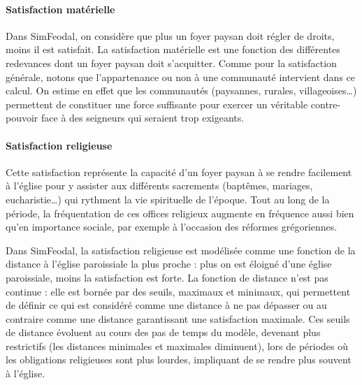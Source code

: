 \paragraph{Satisfaction matérielle}

\begin{tcolorbox}[breakable,left=0pt,right=0pt,top=0pt,bottom=0pt,
	colback=gray!15,colframe=gray!15,width=\dimexpr\textwidth\relax, 
	enlarge left by=0mm, boxsep=5pt,arc=0pt,outer arc=0pt]
Dans SimFeodal, on considère que plus un foyer paysan doit régler de droits, moins il est satisfait.
La satisfaction matérielle est une fonction des différentes redevances dont un foyer paysan doit s'acquitter.
Comme pour la satisfaction générale, notons que l'appartenance ou non à une communauté intervient dans ce calcul.
On estime en effet que les communautés (paysannes, rurales, villageoises\ldots) permettent de constituer une force suffisante pour exercer un véritable contre-pouvoir face à des seigneurs qui seraient trop exigeants.
\end{tcolorbox}

\paragraph{Satisfaction religieuse}

Cette satisfaction représente la capacité d'un foyer paysan à se rendre facilement à l'église pour y assister aux différents sacrements (baptêmes, mariages, eucharistie\ldots) qui rythment la vie spirituelle de l'époque.
Tout au long de la période, la fréquentation de ces offices religieux augmente en fréquence aussi bien qu'en importance sociale, par exemple à l'occasion des réformes grégoriennes.

\begin{tcolorbox}[breakable,left=0pt,right=0pt,top=0pt,bottom=0pt,
	colback=gray!15,colframe=gray!15,width=\dimexpr\textwidth\relax, 
	enlarge left by=0mm, boxsep=5pt,arc=0pt,outer arc=0pt]
Dans SimFeodal, la satisfaction religieuse est modélisée comme une fonction de la distance à l'église paroissiale la plus proche : plus on est éloigné d'une église paroissiale, moins la satisfaction est forte.
La fonction de distance n'est pas continue : elle est bornée par des seuils, maximaux et minimaux, qui permettent de définir ce qui est considéré comme une distance à ne pas dépasser ou au contraire comme une distance garantissant une satisfaction maximale.
Ces seuils de distance évoluent au cours des pas de temps du modèle, devenant plus restrictifs (les distances minimales et maximales diminuent), lors de périodes où les obligations religieuses sont plus lourdes, impliquant de se rendre plus souvent à l'église.
\end{tcolorbox}

